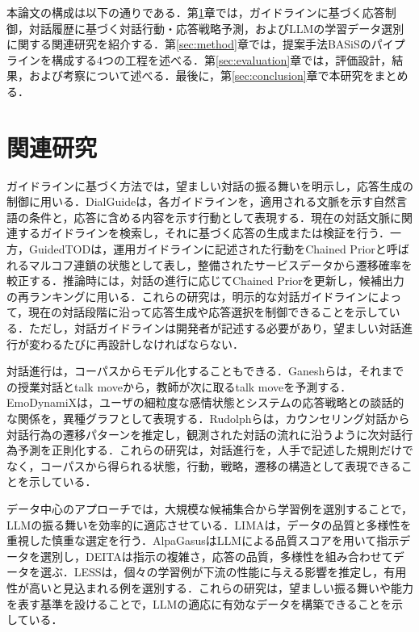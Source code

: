 \documentclass[manuscript,review,anonymous]{acmart}
\begin{document}
本論文の構成は以下の通りである．第\ref{sec:relwork}章では，ガイドラインに基づく応答制御，対話履歴に基づく対話行動・応答戦略予測，およびLLMの学習データ選別に関する関連研究を紹介する．第\ref{sec:method}章では，提案手法BASiSのパイプラインを構成する4つの工程を述べる．第\ref{sec:evaluation}章では，評価設計，結果，および考察について述べる．最後に，第\ref{sec:conclusion}章で本研究をまとめる．


\section{関連研究}
\label{sec:relwork}

ガイドラインに基づく方法では，望ましい対話の振る舞いを明示し，応答生成の制御に用いる．DialGuide\allowbreak{}は，各ガイドラインを，適用される文脈を示す自然言語の条件と，応答に含める内容を示す行動として表現する\cite{gupta2023dialguide}．現在の対話文脈に関連するガイドラインを検索し，それに基づく応答の生成または検証を行う．一方，GuidedTOD\allowbreak{}は，運用ガイドラインに記述された行動をChained Prior\allowbreak{}と呼ばれるマルコフ連鎖の状態として表し，整備されたサービスデータから遷移確率を較正する\cite{wen2025guidedtod}．推論時には，対話の進行に応じてChained Prior\allowbreak{}を更新し，候補出力の再ランキングに用いる．これらの研究は，明示的な対話ガイドラインによって，現在の対話段階に沿って応答生成や応答選択を制御できることを示している．ただし，対話ガイドラインは開発者が記述する必要があり，望ましい対話進行が変わるたびに再設計しなければならない．

対話進行は，コーパスからモデル化することもできる．Ganeshらは，それまでの授業対話とtalk moveから，教師が次に取るtalk moveを予測する\cite{ganesh2021teacher}．EmoDynamiXは，ユーザの細粒度な感情状態とシステムの応答戦略との談話的な関係を，異種グラフとして表現する\cite{wan2025emodynamix}．Rudolphらは，カウンセリング対話から対話行為の遷移パターンを推定し，観測された対話の流れに沿うように次対話行為予測を正則化する\cite{rudolph2026transition}．これらの研究は，対話進行を，人手で記述した規則だけでなく，コーパスから得られる状態，行動，戦略，遷移の構造として表現できることを示している．

データ中心のアプローチでは，大規模な候補集合から学習例を選別することで，LLMの振る舞いを効率的に適応させている．LIMA\allowbreak{}は，データの品質と多様性を重視した慎重な選定を行う\cite{zhou2023lima}．AlpaGasus\allowbreak{}はLLMによる品質スコアを用いて指示データを選別し，DEITA\allowbreak{}は指示の複雑さ，応答の品質，多様性を組み合わせてデータを選ぶ\cite{chen2023alpagasus,liu2024deita}．LESS\allowbreak{}は，個々の学習例が下流の性能に与える影響を推定し，有用性が高いと見込まれる例を選別する\cite{xia2024less}．これらの研究は，望ましい振る舞いや能力を表す基準を設けることで，LLMの適応に有効なデータを構築できることを示している．
\end{document}
